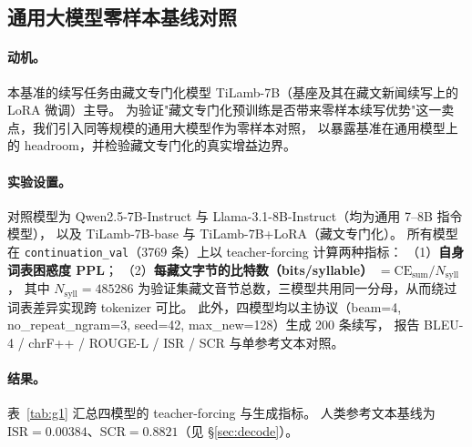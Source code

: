 
\subsection{通用大模型零样本基线对照}\label{sec:g1}

\paragraph{动机。}
本基准的续写任务由藏文专门化模型 TiLamb-7B（基座及其在藏文新闻续写上的 LoRA 微调）主导。
为验证"藏文专门化预训练是否带来零样本续写优势"这一卖点，我们引入同等规模的通用大模型作为零样本对照，
以暴露基准在通用模型上的 headroom，并检验藏文专门化的真实增益边界。

\paragraph{实验设置。}
对照模型为 Qwen2.5-7B-Instruct 与 Llama-3.1-8B-Instruct（均为通用 7--8B 指令模型），
以及 TiLamb-7B-base 与 TiLamb-7B+LoRA（藏文专门化）。
所有模型在 \texttt{continuation\_val}（3769 条）上以 teacher-forcing 计算两种指标：
（1）\textbf{自身词表困惑度 PPL}；
（2）\textbf{每藏文字节的比特数（bits/syllable）} $= \mathrm{CE}_{\text{sum}} / N_{\text{syll}}$，
其中 $N_{\text{syll}}=485286$ 为验证集藏文音节总数，三模型共用同一分母，从而绕过词表差异实现跨 tokenizer 可比。
此外，四模型均以主协议（beam=4, no\_repeat\_ngram=3, seed=42, max\_new=128）生成 200 条续写，
报告 BLEU-4 / chrF++ / ROUGE-L / ISR / SCR 与单参考文本对照。

\paragraph{结果。}
表~\ref{tab:g1} 汇总四模型的 teacher-forcing 与生成指标。
人类参考文本基线为 $\mathrm{ISR}=0.00384$、$\mathrm{SCR}=0.8821$（见 \S\ref{sec:decode}）。

